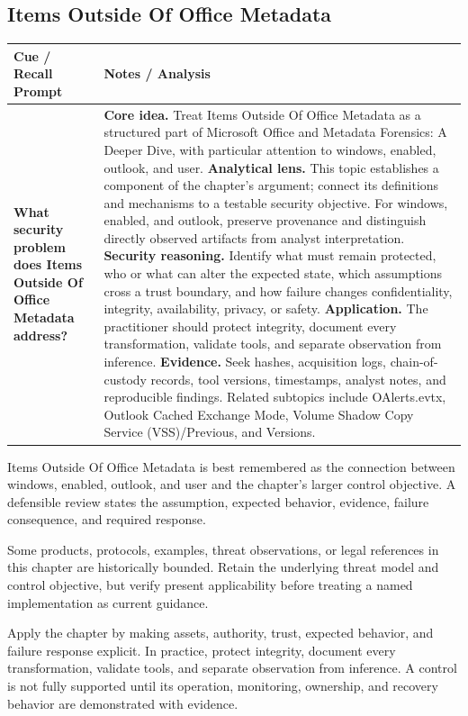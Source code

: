\documentclass[11pt]{article}
\newcommand{\CornellHeader}{%
\rowcolor{Navy}\color{white}\bfseries Cue / Recall Prompt & \color{white}\bfseries Notes / Analysis\\\hline}
\newcommand{\CornellRow}[2]{%
\cellcolor{CueGray}\RaggedRight\textbf{#1} & \RaggedRight #2\\\hline}
\begin{document}
\subsection*{Items Outside Of Office Metadata}
\begin{longtable}{>{\RaggedRight\arraybackslash}p{}|>{\RaggedRight\arraybackslash}p{}}
\CornellHeader
\CornellRow{What security problem does Items Outside Of Office Metadata address?}{\textbf{Core idea.} Treat Items Outside Of Office Metadata as a structured part of Microsoft Office and Metadata Forensics: A Deeper Dive, with particular attention to windows, enabled, outlook, and user. \textbf{Analytical lens.} This topic establishes a component of the chapter's argument; connect its definitions and mechanisms to a testable security objective. For windows, enabled, and outlook, preserve provenance and distinguish directly observed artifacts from analyst interpretation. \textbf{Security reasoning.} Identify what must remain protected, who or what can alter the expected state, which assumptions cross a trust boundary, and how failure changes confidentiality, integrity, availability, privacy, or safety. \textbf{Application.} The practitioner should protect integrity, document every transformation, validate tools, and separate observation from inference. \textbf{Evidence.} Seek hashes, acquisition logs, chain-of-custody records, tool versions, timestamps, analyst notes, and reproducible findings. Related subtopics include OAlerts.evtx, Outlook Cached Exchange Mode, Volume Shadow Copy Service (VSS)/Previous, and Versions.}
\end{longtable}
\begin{topicsummary}
Items Outside Of Office Metadata is best remembered as the connection between windows, enabled, outlook, and user and the chapter's larger control objective. A defensible review states the assumption, expected behavior, evidence, failure consequence, and required response.
\end{topicsummary}
\begin{historybox}
Some products, protocols, examples, threat observations, or legal references in this chapter are historically bounded. Retain the underlying threat model and control objective, but verify present applicability before treating a named implementation as current guidance.
\end{historybox}
\begin{defensebox}
Apply the chapter by making assets, authority, trust, expected behavior, and failure response explicit. In practice, protect integrity, document every transformation, validate tools, and separate observation from inference. A control is not fully supported until its operation, monitoring, ownership, and recovery behavior are demonstrated with evidence.
\end{defensebox}
\end{document}
